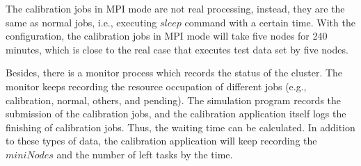 The calibration jobs in MPI mode are not real processing, instead, they are the same as normal jobs, i.e., executing $sleep$ command with a certain time.
With the configuration, the calibration jobs in MPI mode will take five nodes for 240 minutes, which is close to the real case that executes test data set by five nodes.

Besides, there is a monitor process which records the status of the cluster.
The monitor keeps recording the resource occupation of different jobs (e.g., calibration, normal, others, and pending).
The simulation program records the submission of the calibration jobs, and the calibration application itself logs the finishing of calibration jobs.
Thus, the waiting time can be calculated.
In addition to these types of data, the calibration application will keep recording the $miniNodes$ and the number of left tasks by the time.

